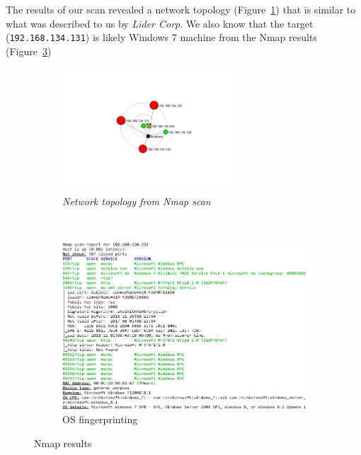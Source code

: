 \documentclass{article}[12 pt,a4paper]
\begin{document}
The results of our scan revealed a network topology (Figure~\ref{nmap_topo}) that is similar to what was described to us by \emph{Lider Corp}. We also know that the target (\texttt{192.168.134.131}) is likely Windows 7 machine from the Nmap results (Figure~\ref{nmap_fingerprint})

\begin{figure}
        \centering
        \begin{subfigure}{0.4\textwidth}
		\centering
		\includegraphics[width=0.7\textwidth]{scan/nmap_topo}
		\caption{\emph{Network topology from Nmap scan}}
		\label{nmap_topo}
        \end{subfigure}%
        ~ %
        \begin{subfigure}{0.6\textwidth}
                \centering
                \includegraphics[width=\textwidth, page=7]{scan/nmap_5_selected}
                \caption{OS fingerprinting}
                \label{nmap_fingerprint}
        \end{subfigure}
        \caption{Nmap results}
\end{figure}
\end{document}
